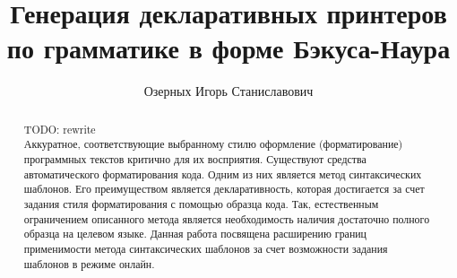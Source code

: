 \title{Генерация декларативных принтеров по грамматике в форме Бэкуса-Наура}


\author{Озерных Игорь Станиславович}



\maketitle             

\begin{abstract}
TODO: rewrite \\
Аккуратное, соответствующие выбранному стилю оформление (форматирование)
программных текстов критично для их восприятия.
Существуют средства автоматического форматирования кода. Одним
из них является метод синтаксических шаблонов. Его преимуществом является декларативность, которая
достигается за счет задания стиля форматирования с помощью образца кода. Так, естественным ограничением
описанного метода является необходимость наличия достаточно полного образца на целевом языке.
Данная работа посвящена расширению границ применимости метода синтаксических шаблонов
за счет возможности задания шаблонов в режиме онлайн.
\end{abstract}









